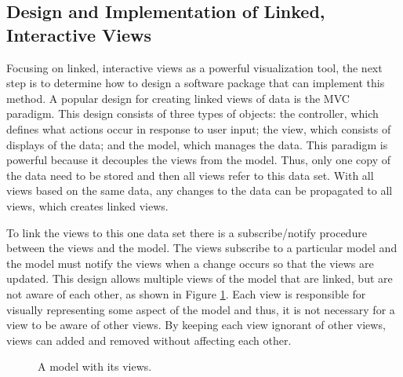 \documentclass{article}[11pt]
\begin{document}
\subsection{Design and Implementation of Linked, Interactive Views}
\label{Ssec:Design} 

Focusing on linked, interactive views as a powerful visualization tool, the
next step is to determine how to design a software package that can implement
this method.  A popular design for creating linked views of data is the
MVC paradigm.  This design consists of three types of objects: the controller,
which defines what actions occur in response to user input; the view, which
consists of displays of the data; and the model, which manages the data.  This
paradigm is powerful because it decouples the views from the model.  Thus,
only one copy of the data need to be stored and then all views refer to this
data set.  With all views based on the same data, any changes to the data can
be propagated to all views, which creates linked views. 

To link the views to this one data set there is a subscribe/notify procedure
between the views and the model.  The views subscribe to a particular model
and the model must notify the views when a change occurs so that the views
are updated.  This design allows multiple views of the model that are
linked, but are not aware of each other, as shown in Figure \ref{Fig:ExMVC}.
Each view is responsible for visually representing some aspect of the model
and thus, it is not necessary for a view to be aware of other views.  By
keeping each view ignorant of other views, views can added and removed without
affecting each other. 

\begin{figure}[ht]
  \begin{center}
    \caption{ A model with its views. }
    \label{Fig:ExMVC}
  \end{center}
\end{figure}
\end{document}
